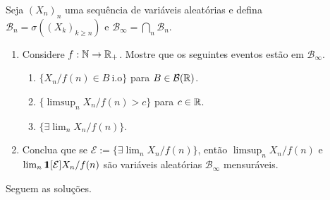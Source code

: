 \begin{exercise}
	Seja $(X_n)_n$ uma sequência de variáveis aleatórias e
	defina $\mathcal{B}_n = \sigma((X_k)_{k \geq n})$ e
	$\mathcal{B}_\infty = \bigcap_n \mathcal{B}_n$.
	\begin{enumerate}[label=(\alph*)]
		\item Considere $f : \mathbb{N} \rightarrow \mathbb{R}_+$. Mostre que os seguintes eventos
			estão em $\mathcal{B}_\infty$.
			\begin{enumerate}[label=(\roman*)]
				\item $\{X_n/f(n) \in B \ \text{i.o}\}$ para $B \in \mathcal{B}(\mathbb{R})$.
				\item $\{\limsup_n X_n/f(n) > c\}$ para $c \in \mathbb{R}$.
				\item $\{\exists \lim_n X_n/f(n)\}$.
			\end{enumerate}
		\item Conclua que se $\mathcal{E} := \{\exists \lim_n X_n/f(n)\}$,
			então $\limsup_n X_n/f(n)$ e $\lim_n \hbox{$1\mkern-6.5mu1$}[\mathcal{E}]X_n/f(n)$ são
			variáveis aleatórias $\mathcal{B}_\infty$ mensuráveis.
	\end{enumerate}
\end{exercise}
Seguem as soluções.
